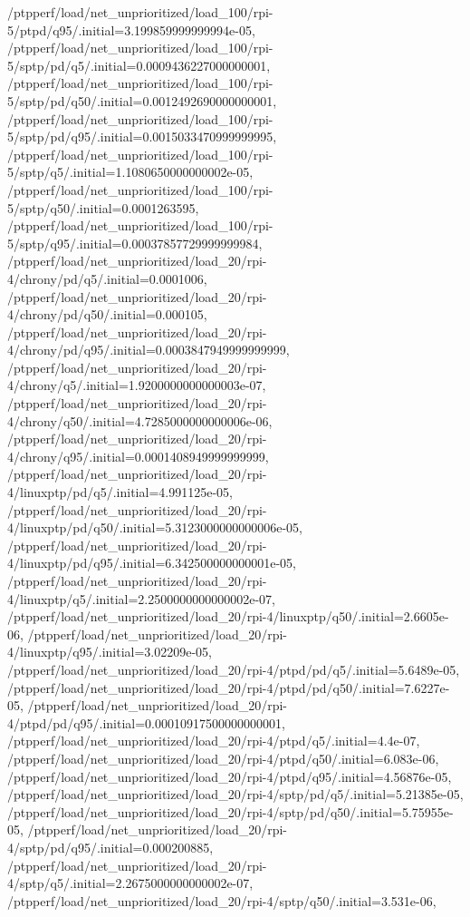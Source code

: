 {    /ptpperf/load/net_unprioritized/load_100/rpi-5/ptpd/q95/.initial=3.199859999999994e-05,
    /ptpperf/load/net_unprioritized/load_100/rpi-5/sptp/pd/q5/.initial=0.0009436227000000001,
    /ptpperf/load/net_unprioritized/load_100/rpi-5/sptp/pd/q50/.initial=0.0012492690000000001,
    /ptpperf/load/net_unprioritized/load_100/rpi-5/sptp/pd/q95/.initial=0.0015033470999999995,
    /ptpperf/load/net_unprioritized/load_100/rpi-5/sptp/q5/.initial=1.1080650000000002e-05,
    /ptpperf/load/net_unprioritized/load_100/rpi-5/sptp/q50/.initial=0.0001263595,
    /ptpperf/load/net_unprioritized/load_100/rpi-5/sptp/q95/.initial=0.00037857729999999984,
    /ptpperf/load/net_unprioritized/load_20/rpi-4/chrony/pd/q5/.initial=0.0001006,
    /ptpperf/load/net_unprioritized/load_20/rpi-4/chrony/pd/q50/.initial=0.000105,
    /ptpperf/load/net_unprioritized/load_20/rpi-4/chrony/pd/q95/.initial=0.0003847949999999999,
    /ptpperf/load/net_unprioritized/load_20/rpi-4/chrony/q5/.initial=1.9200000000000003e-07,
    /ptpperf/load/net_unprioritized/load_20/rpi-4/chrony/q50/.initial=4.7285000000000006e-06,
    /ptpperf/load/net_unprioritized/load_20/rpi-4/chrony/q95/.initial=0.0001408949999999999,
    /ptpperf/load/net_unprioritized/load_20/rpi-4/linuxptp/pd/q5/.initial=4.991125e-05,
    /ptpperf/load/net_unprioritized/load_20/rpi-4/linuxptp/pd/q50/.initial=5.3123000000000006e-05,
    /ptpperf/load/net_unprioritized/load_20/rpi-4/linuxptp/pd/q95/.initial=6.342500000000001e-05,
    /ptpperf/load/net_unprioritized/load_20/rpi-4/linuxptp/q5/.initial=2.2500000000000002e-07,
    /ptpperf/load/net_unprioritized/load_20/rpi-4/linuxptp/q50/.initial=2.6605e-06,
    /ptpperf/load/net_unprioritized/load_20/rpi-4/linuxptp/q95/.initial=3.02209e-05,
    /ptpperf/load/net_unprioritized/load_20/rpi-4/ptpd/pd/q5/.initial=5.6489e-05,
    /ptpperf/load/net_unprioritized/load_20/rpi-4/ptpd/pd/q50/.initial=7.6227e-05,
    /ptpperf/load/net_unprioritized/load_20/rpi-4/ptpd/pd/q95/.initial=0.00010917500000000001,
    /ptpperf/load/net_unprioritized/load_20/rpi-4/ptpd/q5/.initial=4.4e-07,
    /ptpperf/load/net_unprioritized/load_20/rpi-4/ptpd/q50/.initial=6.083e-06,
    /ptpperf/load/net_unprioritized/load_20/rpi-4/ptpd/q95/.initial=4.56876e-05,
    /ptpperf/load/net_unprioritized/load_20/rpi-4/sptp/pd/q5/.initial=5.21385e-05,
    /ptpperf/load/net_unprioritized/load_20/rpi-4/sptp/pd/q50/.initial=5.75955e-05,
    /ptpperf/load/net_unprioritized/load_20/rpi-4/sptp/pd/q95/.initial=0.000200885,
    /ptpperf/load/net_unprioritized/load_20/rpi-4/sptp/q5/.initial=2.2675000000000002e-07,
    /ptpperf/load/net_unprioritized/load_20/rpi-4/sptp/q50/.initial=3.531e-06,
}
